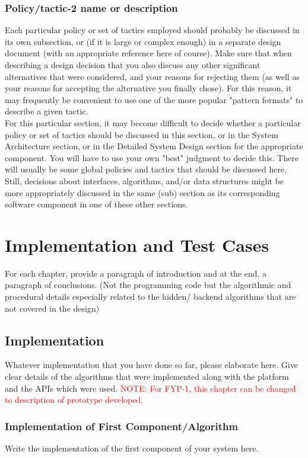 \documentclass{FastFyp}
\begin{document}
\subsection{Policy/tactic-2 name or description}
Each particular policy or set of tactics employed should probably be discussed in its own subsection, or (if it is large or complex enough) in a separate design document (with an appropriate reference here of course). Make sure that when describing a design decision that you also discuss any other significant alternatives that were considered, and your reasons for rejecting them (as well as your reasons for accepting the alternative you finally chose). For this reason, it may frequently be convenient to use one of the more popular "pattern formats" to describe a given tactic.\\
For this particular section, it may become difficult to decide whether a particular policy or set of tactics should be discussed in this section, or in the System Architecture section, or in the Detailed System Design section for the appropriate component. You will have to use your own "best" judgment to decide this. There will usually be some global policies and tactics that should be discussed here. Still, decisions about interfaces, algorithms, and/or data structures might be more appropriately discussed in the same (sub) section as its corresponding software component in one of these other sections.
\chapter{Implementation and Test Cases}
For each chapter, provide a paragraph of introduction and at the end, a paragraph of conclusions. (Not the programming code but the algorithmic and procedural details especially related to the hidden/ backend algorithms that are not covered in the design)
\section{Implementation}
Whatever implementation that you have done so far, please elaborate here.
Give clear details of the algorithms that were implemented along with the platform and the APIs which were used. 
\textcolor{red}{NOTE: For FYP-1, this chapter can be changed to description of prototype developed.}
\subsection{Implementation of First Component/Algorithm}
Write the implementation of the first component of your system here.
\end{document}
